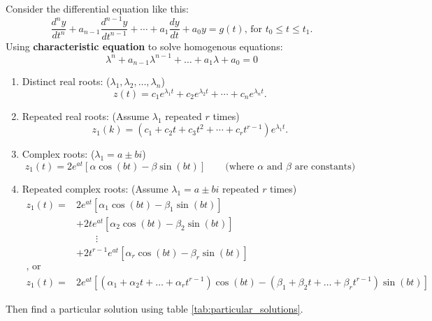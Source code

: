Consider the differential equation like this:
\[
    \frac{d^ny}{dt^n} + a_{n-1}\frac{d ^{n-1}y}{dt ^{n-1}} + \cdots + a_1\frac{dy}{dt} + a_0y = g(t), \, \text{for } t_0 \leq t \leq t_1.
\]
Using \textbf{characteristic equation} to solve homogenous equations:
\[
    \lambda^{n} + a_{n - 1}\lambda^{n - 1} + \dots +a_{1}\lambda +a_{0} = 0
\]

\begin{enumerate}
    \item Distinct real roots: ($\lambda_1, \lambda_2,\dots,\lambda_n$)\[
              z(t) = c_1e ^{\lambda_1t} + c_2e ^{\lambda_2t} + \cdots + c_ne ^{\lambda_nt}.
          \]
    \item Repeated real roots: (Assume $\lambda_1$ repeated $r$ times)\[
              z_1(k) = (c_1 + c_2t+c_3t ^{2} + \cdots + c_r t ^{r-1})e ^{\lambda_1t}.
          \]
    \item Complex roots: ($\lambda_1 = a\pm bi$) \[
              z_1(t) = 2e ^{at}[\alpha \cos(bt) - \beta \sin(bt)] \qquad \text{(where $\alpha$ and $\beta$ are constants)}
          \]
    \item Repeated complex roots: (Assume $\lambda_1 = a\pm bi$ repeated $r$ times) \begin{align*}
              z_1(t) = & 2e ^{at}[\alpha_1 \cos(bt) - \beta_1 \sin(bt)]                                                                              \\
                       & + 2te ^{at}[\alpha_2 \cos(bt) - \beta_2 \sin(bt)]                                                                           \\
                       & \qquad \vdots                                                                                                               \\
                       & + 2t^{r-1} e^{at}[\alpha_r \cos(bt) - \beta_r \sin(bt)]                                                                     \\
              \text{, or}                                                                                                                            \\
              z_1(t) = & 2e ^{at}[(\alpha_1 +\alpha_2t + \dots + \alpha_rt ^{r-1})\cos(bt) - (\beta_1 + \beta_2t + \dots + \beta_rt ^{r-1})\sin(bt)]
          \end{align*}
\end{enumerate}

Then find a particular solution using table \ref{tab:particular_solutions}.

